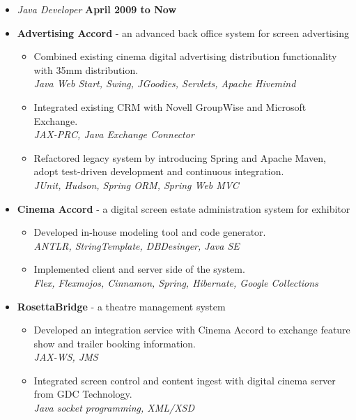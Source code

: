 \documentclass[10pt]{article}
\newenvironment{outerlist}[1][\enskip\textbullet]%
        {\begin{itemize}[#1]}{\end{itemize}%
         \vspace{-.6\baselineskip}}
\newcommand{\blankline}{\quad\pagebreak[2]}
\begin{document}
\begin{outerlist}

\item[] \textit{Java Developer}%
        \hfill \textbf{April 2009 to Now}
\item[] {\textbf{Advertising Accord} - an advanced back office system for screen advertising}
\begin{outerlist}
\item Combined existing cinema digital advertising distribution functionality with 35mm distribution.\\
\textit {Java Web Start, Swing, JGoodies, Servlets, Apache Hivemind}
\item Integrated existing CRM with Novell GroupWise and Microsoft Exchange.\\
\textit {JAX-PRC, Java Exchange Connector}
\item Refactored legacy system by introducing Spring and Apache Maven, adopt test-driven development and continuous integration.\\
\textit {JUnit, Hudson, Spring ORM, Spring Web MVC}
\end{outerlist}

\item[] {\textbf{Cinema Accord} - a digital screen estate administration system for exhibitor}
\begin{outerlist}
\item Developed in-house modeling tool and code generator.\\
\textit {ANTLR, StringTemplate, DBDesinger, Java SE}
\item Implemented client and server side of the system.\\
\textit {Flex, Flexmojos, Cinnamon, Spring, Hibernate, Google Collections}
\end{outerlist}

\item[] {\textbf{RosettaBridge} - a theatre management system}
\begin{outerlist}
\item Developed an integration service with Cinema Accord to exchange feature show and trailer booking information.\\
\textit {JAX-WS, JMS}
\item Integrated screen control and content ingest with digital cinema server from GDC Technology.\\
\textit {Java socket programming, XML/XSD}
\end{outerlist}

\end{outerlist}
\blankline
\end{document}

